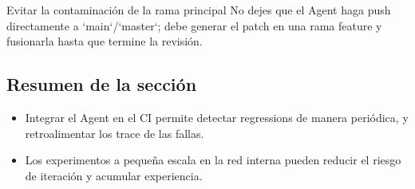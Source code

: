 \begin{warningbox}{Evitar la contaminación de la rama principal}
No dejes que el Agent haga push directamente a `main`/`master`; debe generar el patch en una rama feature y fusionarla hasta que termine la revisión.
\end{warningbox}

\subsection{Resumen de la sección}
\begin{itemize}
    \item Integrar el Agent en el CI permite detectar regressions de manera periódica, y retroalimentar los trace de las fallas.
    \item Los experimentos a pequeña escala en la red interna pueden reducir el riesgo de iteración y acumular experiencia.
\end{itemize}

